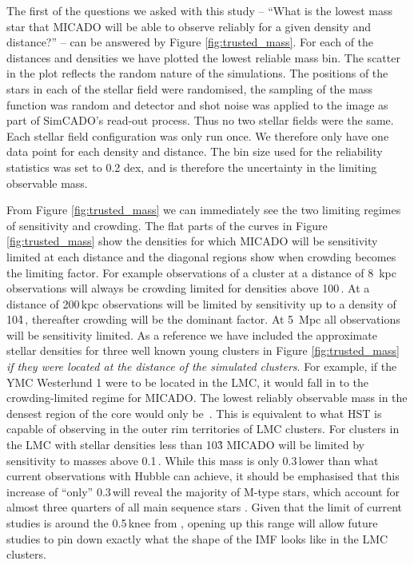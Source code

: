 The first of the questions we asked with this study -- ``What is the lowest
mass star that MICADO will be able to observe reliably for a given density and
distance?'' -- can be answered by Figure \ref{fig:trusted_mass}. For each of
the distances and densities we have plotted the lowest reliable mass bin. The
scatter in the plot reflects the random nature of the simulations. The
positions of the stars in each of the stellar field were randomised, the
sampling of the mass function was random and detector and shot noise was
applied to the image as part of SimCADO's read-out process. Thus no two  stellar
fields were the same. Each stellar field configuration was only run once. We
therefore only have one data point for each density and distance. The bin size
used for the reliability statistics was set to 0.2 dex, and is therefore the
uncertainty in the limiting observable mass.

From Figure \ref{fig:trusted_mass} we can immediately see the two limiting
regimes of sensitivity and crowding. The flat parts of the curves in Figure
\ref{fig:trusted_mass} show the densities for which MICADO will be sensitivity
limited at each distance and the diagonal regions show when crowding becomes
the limiting factor. For example observations of a cluster at a distance of 8\,
kpc observations will always be crowding limited for densities above 100\,\spae.
At a distance of 200\,kpc observations will be limited by sensitivity up to a
density of 10\h4\,\spa, thereafter crowding will be the dominant factor. At
5\, Mpc all observations will be sensitivity limited. As a reference we have
included the approximate stellar densities for three well known young  clusters
in Figure \ref{fig:trusted_mass} \textit{if they were located at the distance
of the simulated clusters}. For example, if the YMC Westerlund 1 were to be
located in the LMC, it would fall in to the crowding-limited regime for MICADO.
The lowest reliably observable mass in the densest region of the core would
only be \,\msun. This is equivalent to what HST is capable of observing
in the outer rim territories of LMC clusters. For clusters in the LMC with
stellar densities less than 10\h3 MICADO will be limited by sensitivity to
masses above 0.1\,\msun. While this mass is only 0.3\,\msun lower than what
current observations with Hubble can achieve, it should be emphasised that
this increase of ``only'' 0.3\,\msun will reveal the majority of M-type stars,
which account for almost three quarters of all main sequence stars
\citep{ledrew2001}. Given that the limit of current studies is around
the 0.5\,\msun knee from \citet{kroupa2001}, opening up this range will allow
future studies to pin down exactly what the shape of the IMF looks like in the
LMC clusters.

